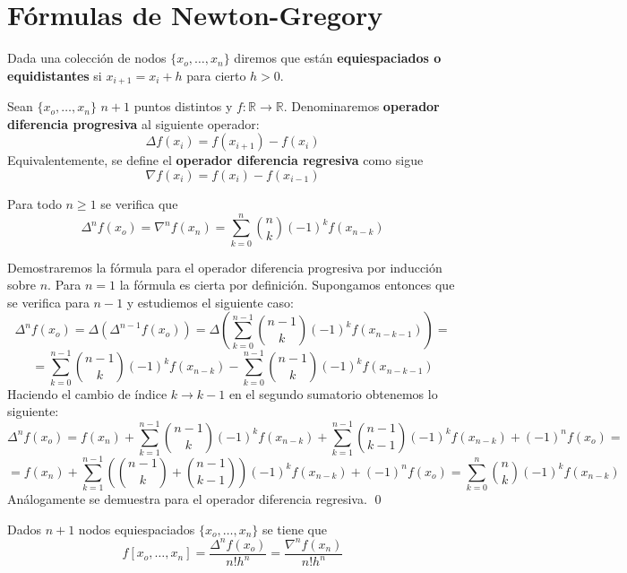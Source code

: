         \section{Fórmulas de Newton-Gregory}
        \begin{defin}
        Dada una colección de nodos $\{x_o,\ldots,x_n\}$ diremos que están \textbf{equiespaciados o equidistantes} si $x_{i+1}=x_i +h$ para cierto $h>0$.
        \end{defin}
        \begin{defin}
        Sean $\{x_o,\ldots,x_n\}$ $n+1$ puntos distintos y $f:\mathbb{R}\longrightarrow\mathbb{R}$. Denominaremos \textbf{operador diferencia progresiva} al siguiente operador:
        $$\Delta f(x_i)=f(x_{i+1})-f(x_i)$$
        Equivalentemente, se define el \textbf{operador diferencia regresiva} como sigue
        $$\nabla f(x_i)=f(x_i)-f(x_{i-1})$$
        \end{defin}
        \begin{prop}
        Para todo $n\geq1$ se verifica que
        $$\Delta^n f(x_o)=\nabla ^n f(x_n)=\sum_{k=0}^n \binom{n}{k} (-1)^k f(x_{n-k})$$
        \end{prop}
        \begin{dem}
        Demostraremos la fórmula para el operador diferencia progresiva por inducción sobre $n$. Para $n=1$ la fórmula es cierta por definición. Supongamos entonces que se verifica para $n-1$ y estudiemos el siguiente caso:
        $$\Delta^n f(x_o)=\Delta(\Delta^{n-1}f(x_o))=\Delta\left(\sum_{k=0}^{n-1} \binom{n-1}{k} (-1)^kf(x_{n-k-1})\right)=$$
        $$=\sum_{k=0}^{n-1} \binom{n-1}{k} (-1)^k f(x_{n-k})-\sum_{k=0}^{n-1} \binom{n-1}{k} (-1)^kf(x_{n-k-1})$$
        Haciendo el cambio de índice $k\to k-1$ en el segundo sumatorio obtenemos lo siguiente:
        $$\Delta^n f(x_o)=f(x_n)+\sum_{k=1}^{n-1}\binom{n-1}{k} (-1)^k f(x_{n-k})+\sum_{k=1}^{n-1}\binom{n-1}{k-1} (-1)^k  f(x_{n-k})+(-1)^n f(x_o)=$$
        $$=f(x_n)+\sum_{k=1}^{n-1}\left(\binom{n-1}{k}+\binom{n-1}{k-1}\right)(-1)^k f(x_{n-k})+(-1)^n f(x_o)=\sum_{k=0}^n \binom{n}{k} (-1)^k f(x_{n-k})$$
        Análogamente se demuestra para el operador diferencia regresiva.
        \qed\end{dem}
        \begin{prop}
        Dados $n+1$ nodos equiespaciados $\{x_o,\ldots,x_n\}$ se tiene que
        $$f[x_o,\ldots,x_n]=\frac{\Delta^n f(x_o)}{n! h^n}=\frac{\nabla^n f(x_n)}{n! h^n}$$
        \end{prop}
